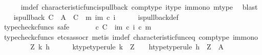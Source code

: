 \begin{isabellebody}
\ \ \ \ \isamarkupfalse%
\ {\isasymchi}im{\isacharunderscore}{\kern0pt}def\ characteristic{\isacharunderscore}{\kern0pt}func{\isacharunderscore}{\kern0pt}is{\isacharunderscore}{\kern0pt}pullback\ comp{\isacharunderscore}{\kern0pt}type\ i{\isacharunderscore}{\kern0pt}type\ im{\isacharunderscore}{\kern0pt}mono\ m{\isacharunderscore}{\kern0pt}type\ \isamarkupfalse%
\ blast\isanewline
\ \ \isamarkupfalse%
\ {\isachardoublequoteopen}is{\isacharunderscore}{\kern0pt}pullback\ C\ {\isasymone}\ A\ {\isasymOmega}\ {\isacharparenleft}{\kern0pt}{\isasymbeta}\isactrlbsub C\isactrlesub {\isacharparenright}{\kern0pt}\ {\isasymt}\ m\ {\isacharparenleft}{\kern0pt}{\isasymchi}im\ {\isasymcirc}\isactrlsub c\ i{\isacharparenright}{\kern0pt}{\isachardoublequoteclose}\isanewline
\ \ \ \ \isamarkupfalse%
\ is{\isacharunderscore}{\kern0pt}pullback{\isacharunderscore}{\kern0pt}def\isanewline
\ \ \isamarkupfalse%
\ {\isacharparenleft}{\kern0pt}typecheck{\isacharunderscore}{\kern0pt}cfuncs{\isacharcomma}{\kern0pt}\ safe{\isacharparenright}{\kern0pt}\isanewline
\ \ \ \ \isamarkupfalse%
\ {\isachardoublequoteopen}{\isasymt}\ {\isasymcirc}\isactrlsub c\ {\isasymbeta}\isactrlbsub C\isactrlesub \ {\isacharequal}{\kern0pt}\ {\isacharparenleft}{\kern0pt}{\isasymchi}im\ {\isasymcirc}\isactrlsub c\ i{\isacharparenright}{\kern0pt}\ {\isasymcirc}\isactrlsub c\ m{\isachardoublequoteclose}\isanewline
\ \ \ \ \ \ \isamarkupfalse%
\ {\isacharparenleft}{\kern0pt}typecheck{\isacharunderscore}{\kern0pt}cfuncs{\isacharcomma}{\kern0pt}\ etcs{\isacharunderscore}{\kern0pt}assocr{\isacharcomma}{\kern0pt}\ metis\ {\isasymchi}im{\isacharunderscore}{\kern0pt}def\ characteristic{\isacharunderscore}{\kern0pt}func{\isacharunderscore}{\kern0pt}eq\ comp{\isacharunderscore}{\kern0pt}type\ im{\isacharunderscore}{\kern0pt}mono{\isacharparenright}{\kern0pt}\isanewline
\ \ \isamarkupfalse%
\isanewline
\ \ \ \ \isamarkupfalse%
\ Z\ k\ h\isanewline
\ \ \ \ \isamarkupfalse%
\ k{\isacharunderscore}{\kern0pt}type{\isacharbrackleft}{\kern0pt}type{\isacharunderscore}{\kern0pt}rule{\isacharbrackright}{\kern0pt}{\isacharcolon}{\kern0pt}\ {\isachardoublequoteopen}k\ {\isacharcolon}{\kern0pt}\ Z\ {\isasymrightarrow}\ {\isasymone}{\isachardoublequoteclose}\ \ h{\isacharunderscore}{\kern0pt}type{\isacharbrackleft}{\kern0pt}type{\isacharunderscore}{\kern0pt}rule{\isacharbrackright}{\kern0pt}{\isacharcolon}{\kern0pt}\ {\isachardoublequoteopen}h\ {\isacharcolon}{\kern0pt}\ Z\ {\isasymrightarrow}\ A{\isachardoublequoteclose}\isanewline

\end{isabellebody}
